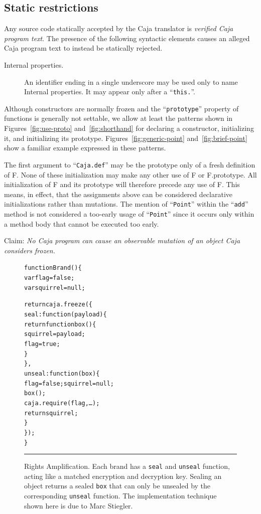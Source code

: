 \documentclass[letterpaper,twocolumn,10pt]{article}
\newcommand{\code}[1]{{\tt {#1}}}              %
\begin{document}
\subsection{Static restrictions}

Any source code statically accepted by the Caja translator is \emph{verified 
Caja program text}. The presence of the following syntactic elements causes 
an alleged Caja program text to instead be statically rejected.

\begin{description}

    \item[Internal properties.] An identifier ending in a single underscore 
    may be used only to name Internal properties. It may appear only after a 
    ``\code{this.}''.

\end{description}

Although constructors are normally frozen and the ``\code{prototype}'' 
property of functions is generally not settable, we allow at least the 
patterns shown in Figures~\ref{fig:use-proto} and~\ref{fig:shorthand} for 
declaring a constructor, initializing it, and initializing its prototype. 
Figures~\ref{fig:generic-point} and~\ref{fig:brief-point} show a familiar 
example expressed in these patterns.

The first argument to ``\code{Caja.def}'' may be the prototype only of a 
fresh definition of F. None of these initialization may make any other use of 
F or F.prototype. All initialization of F and its prototype will therefore 
precede any use of F. This means, in effect, that the assignments above can 
be considered declarative initializations rather than mutations. The mention 
of ``\code{Point}'' within the ``\code{add}'' method is not considered a 
too-early usage of ``\code{Point}'' since it occurs only within a method body 
that cannot be executed too early.

Claim: \emph{No Caja program can cause an observable mutation of an object
Caja considers frozen.}

\begin{figure}[t!]
\begin{alltt}
function Brand() \{
  var flag = false;
  var squirrel = null;

  return caja.freeze(\{
    seal: function(payload) \{
      return function box() \{
        squirrel = payload;
        flag = true;
      \}
    \},
    unseal: function(box) \{
      flag = false; squirrel = null;
      box();
      caja.require(flag,\ldots);
      return squirrel;
    \}
  \});
\}
\end{alltt}

\caption[Rights Amplification]{Rights Amplification. Each brand has a 
\code{seal} and \code{unseal} function, acting like a matched encryption and 
decryption key. Sealing an object returns a sealed \code{box} that can only 
be unsealed by the corresponding \code{unseal} function. The implementation 
technique shown here is due to Marc Stiegler.
\\ } \hrule
\label{fig:rights-amp}
\end{figure}
\end{document}
